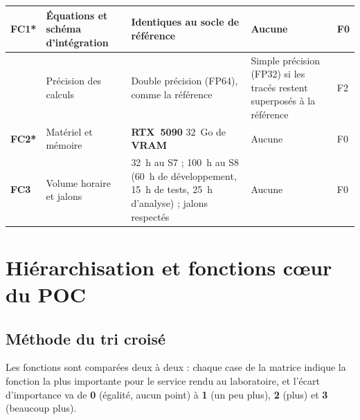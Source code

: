 {\begin{longtable}{|p{1.0cm}|p{4.6cm}|p{4.3cm}|p{3.4cm}|p{0.8cm}|}
\rowcolor{defibg} \textbf{FC1*} & Équations et schéma d'intégration & Identiques au socle de référence & Aucune & F0 \\ \hline
\rowcolor{defibg} & Précision des calculs & Double précision (FP64), comme la référence & Simple précision (FP32) si les tracés restent superposés à la référence & F2 \\ \hline
\rowcolor{defibg} \textbf{FC2*} & Matériel et mémoire & \textbf{RTX~5090} $32$~Go de \textbf{VRAM} & Aucune & F0 \\ \hline
\rowcolor{defibg} \textbf{FC3} & Volume horaire et jalons & 32~h au S7 ; 100~h au S8 (60~h de développement, 15~h de tests, 25~h d'analyse) ; jalons respectés & Aucune & F0 \\ \hline
\end{longtable}}

\medskip
{}

\chapter{Hiérarchisation et fonctions cœur du POC}

\section{Méthode du tri croisé}

Les fonctions sont comparées deux à deux : chaque case de la matrice indique la fonction la plus importante pour le service rendu au laboratoire, et l'écart d'importance va de \textbf{0} (égalité, aucun point) à \textbf{1} (un peu plus), \textbf{2} (plus) et \textbf{3} (beaucoup plus). 

